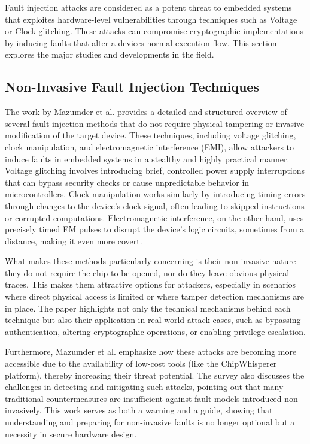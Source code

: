 Fault injection attacks are considered as a potent threat to embedded systems that exploites hardware-level vulnerabilities through techniques such as Voltage or Clock glitching. These attacks can compromise cryptographic implementations by inducing faults that alter a devices normal execution flow. This section explores the major studies and developments in the field.

\subsection*{Non-Invasive Fault Injection Techniques \cite{mazumder2023comprehensive}}

The work by Mazumder et al. provides a detailed and structured overview of several fault injection methods that do not require physical tampering or invasive modification of the target device. These techniques, including voltage glitching, clock manipulation, and electromagnetic interference (EMI), allow attackers to induce faults in embedded systems in a stealthy and highly practical manner. Voltage glitching involves introducing brief, controlled power supply interruptions that can bypass security checks or cause unpredictable behavior in microcontrollers. Clock manipulation works similarly by introducing timing errors through changes to the device’s clock signal, often leading to skipped instructions or corrupted computations. Electromagnetic interference, on the other hand, uses precisely timed EM pulses to disrupt the device's logic circuits, sometimes from a distance, making it even more covert.

What makes these methods particularly concerning is their non-invasive nature they do not require the chip to be opened, nor do they leave obvious physical traces. This makes them attractive options for attackers, especially in scenarios where direct physical access is limited or where tamper detection mechanisms are in place. The paper highlights not only the technical mechanisms behind each technique but also their application in real-world attack cases, such as bypassing authentication, altering cryptographic operations, or enabling privilege escalation.

Furthermore, Mazumder et al. emphasize how these attacks are becoming more accessible due to the availability of low-cost tools (like the ChipWhisperer platform), thereby increasing their threat potential. The survey also discusses the challenges in detecting and mitigating such attacks, pointing out that many traditional countermeasures are insufficient against fault models introduced non-invasively. This work serves as both a warning and a guide, showing that understanding and preparing for non-invasive faults is no longer optional but a necessity in secure hardware design.



